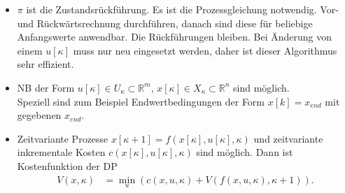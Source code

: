 \begin{remark}\hspace{1mm}
\begin{itemize}
  \item $\pi$ ist die Zustandsrückführung. Es ist die Prozessgleichung notwendig. Vor- und Rückwärtsrechnung durchführen, danach sind diese für beliebige Anfangswerte
  anwendbar. Die Rückführungen bleiben. Bei Änderung von einem $u[\kappa]$ muss nur neu eingesetzt werden, daher ist dieser Algorithmus sehr effizient.
  \item \ac{NB} der Form $u[\kappa]\in U_{\kappa}\subset\mathbb{R}^m$, $x[\kappa]\in X_{\kappa}\subset\mathbb{R}^n$ sind möglich.\\
  Speziell sind zum Beispiel Endwertbedingungen der Form $x[k]=x_{end}$ mit gegebenen $x_{end}$.
  \item Zeitvariante Prozesse $x[\kappa+1]=f(x[\kappa],u[\kappa],\kappa)$ und zeitvariante inkrementale Kosten $c(x[\kappa],u[\kappa],\kappa)$ sind möglich. Dann ist Kostenfunktion der
  \ac{DP}
  \begin{align*}
  	V(x,\kappa) & = \min\limits_u\left(c(x,u,\kappa)+V\left(f(x,u,\kappa), \kappa +1 \right) \right).
  \end{align*}
\end{itemize}
\end{remark}
